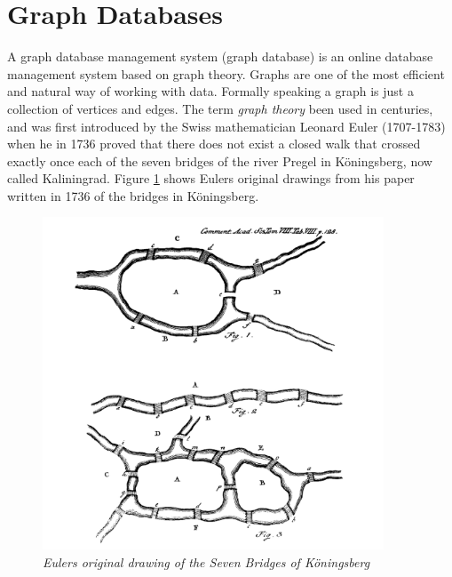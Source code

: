 \section{Graph Databases}
A graph database management system (graph database) \citep{robinson13} is an online database management system %
based on graph theory. Graphs are one of the most efficient and natural way of working with data. Formally speaking a graph is just a collection of vertices and edges. The term \textit{graph theory} been used in centuries, and was first introduced by the Swiss mathematician Leonard Euler (1707-1783) when he in 1736 proved that there does not exist a closed walk that crossed exactly once each of the seven bridges of the river Pregel in Köningsberg, now called Kaliningrad\citep{alexanderson06}. Figure \ref{fig:7bridgesEuler} shows Eulers original drawings from his paper written in 1736 \citep{euler1741} of the bridges in Köningsberg. 

\begin{figure}[H]
  \centering
  \includegraphics[width=4in]{assets/7bridges-euler.png}
  \caption{\textit{Eulers original drawing of the Seven Bridges of Köningsberg}} 
  \label{fig:7bridgesEuler}
\end{figure}

